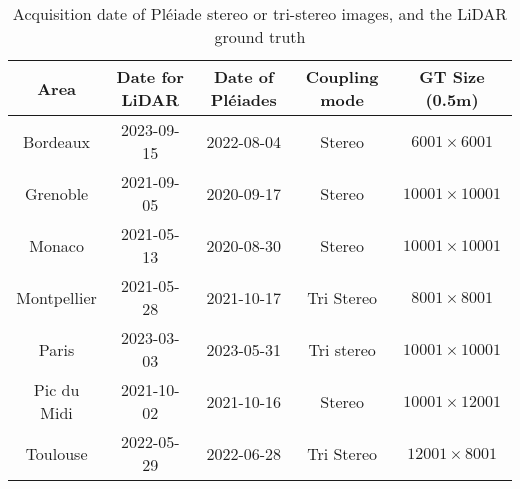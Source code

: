 \begin{table}[ht]
    \centering
    \begin{tabular}{|c||c|c|c|c|}
    \hline
        Area & Date for LiDAR & Date of Pléiades & Coupling mode & GT Size (0.5m)\\
        \hline\hline
        Bordeaux & 2023-09-15 & 2022-08-04 & Stereo & $6001\times 6001$\\\hline
        Grenoble & 2021-09-05 & 2020-09-17 & Stereo & $10 001\times 10 001$ \\\hline
        Monaco & 2021-05-13 & 2020-08-30 & Stereo & $10 001\times 10 001$\\\hline
        Montpellier & 2021-05-28 & 2021-10-17 & Tri Stereo & $8001\times 8001$\\\hline
        Paris & 2023-03-03 & 2023-05-31 & Tri stereo & $10 001\times 10 001$\\\hline
        Pic du Midi & 2021-10-02 & 2021-10-16 & Stereo & $10001 \times 12001$ \\\hline
        Toulouse & 2022-05-29 & 2022-06-28 & Tri Stereo & $12001\times 8001$\\\hline
    \end{tabular}
    \caption{Acquisition date of Pléiade stereo or tri-stereo images, and the LiDAR ground truth}
    \label{tab:my_label}
\end{table}
\pagebreak